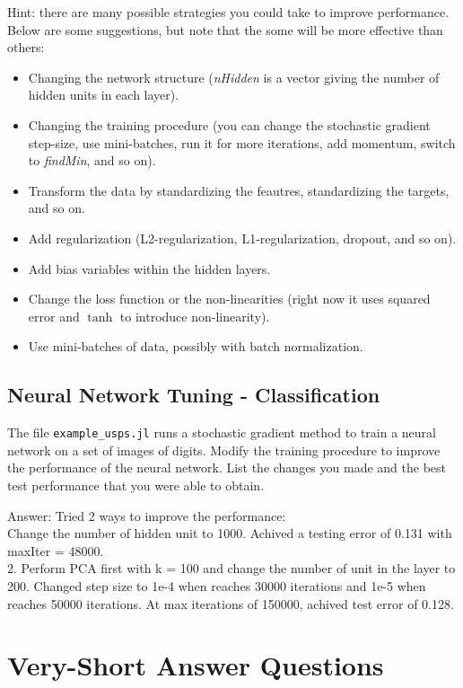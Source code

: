 \documentclass{article}
\def\ans#1{\par\gre{Answer: #1}}
\def\blu#1{{\color{blu}#1}}
\def\gre#1{{\color{gre}#1}}
\def\items#1{\begin{itemize}#1\end{itemize}}
\begin{document}
Hint: there are many possible strategies you could take to improve performance. Below are some suggestions, but note that the some will be more effective than others:
\items{
\item Changing the network structure (\emph{nHidden} is a vector giving the number of hidden units in each layer).
\item Changing the training procedure (you can change the stochastic gradient step-size, use mini-batches, run it for more iterations, add momentum, switch to \emph{findMin}, and so on).
\item Transform the data by standardizing the feautres, standardizing the targets, and so on.
\item Add regularization (L2-regularization, L1-regularization, dropout, and so on).
\item Add bias variables within the hidden layers.
\item Change the loss function or the non-linearities (right now it uses squared error and $\tanh$ to introduce non-linearity).
\item Use mini-batches of data, possibly with batch normalization.
}

\subsection{Neural Network Tuning - Classification}

The file \texttt{example\_usps.jl} runs a stochastic gradient method to train a neural network on a set of images of digits. Modify the training procedure to improve the performance of the neural network. \blu{List the changes you made and the best test performance that you were able to obtain}.
\ans{Tried 2 ways to improve the performance: 
\\Change the number of hidden unit to 1000. Achived a testing error of 0.131 with maxIter = 48000.
\\2. Perform PCA first with k = 100 and change the number of unit in the layer to 200. Changed step size to 1e-4 when reaches 30000 iterations and 1e-5 when reaches 50000 iterations. At max iterations of 150000, achived test error of 0.128.}

\section{Very-Short Answer Questions}
\end{document}
